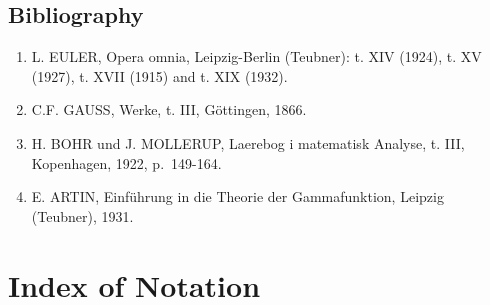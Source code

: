 \section*{Bibliography}
{}

\begin{enumerate}
\def\labelenumi{(\Roman{enumi})}
\item
  L. EULER, Opera omnia, Leipzig-Berlin (Teubner): t. XIV (1924), t. XV (1927), t. XVII (1915) and t. XIX (1932).
\item
  C.F. GAUSS, Werke, t. III, Göttingen, 1866.
\item
  H. BOHR und J. MOLLERUP, Laerebog i matematisk Analyse, t. III, Kopenhagen, 1922, p.~149-164.
\item
  E. ARTIN, Einführung in die Theorie der Gammafunktion, Leipzig (Teubner), 1931.
\end{enumerate}

\backmatter
\chapter*{Index of Notation}
{}

